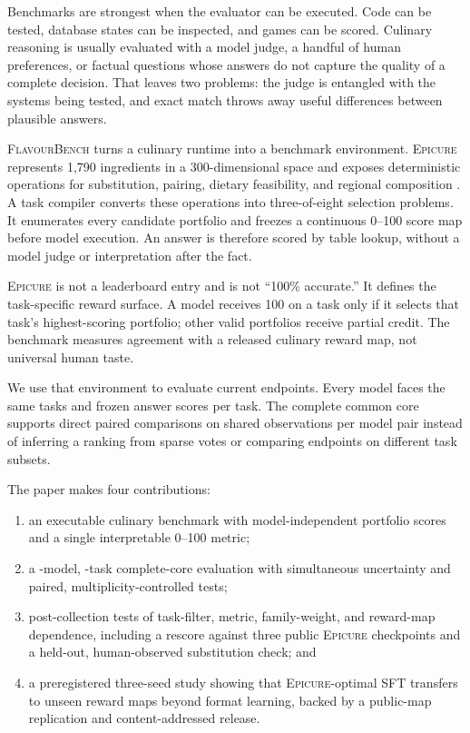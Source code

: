 \documentclass[10pt,twocolumn]{article}
\newcommand{\system}{\textsc{FlavourBench}}
\newcommand{\epicure}{\textsc{Epicure}}
\begin{document}
Benchmarks are strongest when the evaluator can be executed. Code can be tested, database states
can be inspected, and games can be scored. Culinary reasoning is usually evaluated with a model
judge, a handful of human preferences, or factual questions whose answers do not capture the
quality of a complete decision. That leaves two problems: the judge is entangled with the systems
being tested, and exact match throws away useful differences between plausible answers.

\system{} turns a culinary runtime into a benchmark environment. \epicure{} represents 1,790
ingredients in a 300-dimensional space and exposes deterministic operations for substitution,
pairing, dietary feasibility, and regional composition
\cite{radzikowski2026structure,radzikowski2026geometry}. A task compiler converts these operations
into three-of-eight selection problems. It enumerates every candidate portfolio and freezes a
continuous 0--100 score map before model execution. An answer is therefore scored by table lookup,
without a model judge or interpretation after the fact.

\epicure{} is not a leaderboard entry and is not ``100\% accurate.'' It defines the task-specific
reward surface. A model receives 100 on a task only if it selects that task's highest-scoring
portfolio; other valid portfolios receive partial credit. The benchmark measures agreement with a
released culinary reward map, not universal human taste.

We use that environment to evaluate \FBModels{} current endpoints. Every model faces the same
\FBTasks{} tasks and \FBSelectionsPerTask{} frozen answer scores per task. The complete common core
supports direct paired comparisons on \FBTasks{} shared observations per model pair instead of
inferring a ranking from sparse votes or comparing endpoints on different task subsets.

The paper makes four contributions:
\begin{enumerate}[label=\arabic*.]
  \item an executable culinary benchmark with \FBPrefrozenScores{} model-independent portfolio
  scores and a single interpretable 0--100 metric;
  \item a \FBModels{}-model, \FBTasks{}-task complete-core evaluation with simultaneous
  uncertainty and paired, multiplicity-controlled tests;
  \item post-collection tests of task-filter, metric, family-weight, and reward-map dependence,
  including a rescore against three public \epicure{} checkpoints and a held-out, human-observed
  substitution check; and
  \item a preregistered three-seed study showing that \epicure{}-optimal SFT transfers to unseen
  reward maps beyond format learning, backed by a public-map replication and content-addressed
  release.
\end{enumerate}
\end{document}
